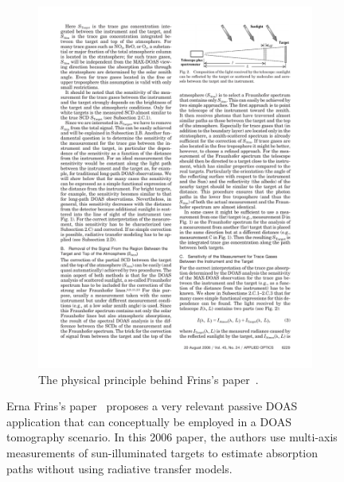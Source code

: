 \begin{figure}[htpb]
\begin{subfigure}[b]{.475\textwidth}
        \includegraphics[trim=10.8cm 22.8cm 1cm 1cm, clip, %
        width=\textwidth]{img/pdf/frinsSchematics_p3.pdf}
        \caption{The physical principle behind Frins's
        paper~\cite{Frins2006}.}
        \label{fig:frins_schem_2}
    \end{subfigure}
    \caption{Erna Frins's paper~\cite{Frins2006} proposes a very
        relevant passive \gls{DOAS} application that can conceptually be
        employed in a \gls{DOAS} tomography scenario. In this 2006
        paper, the authors use multi-axis measurements of
        sun-illuminated targets to estimate absorption paths without
        using radiative transfer models.}
    \label{fig:ernafrins}
\end{figure}

